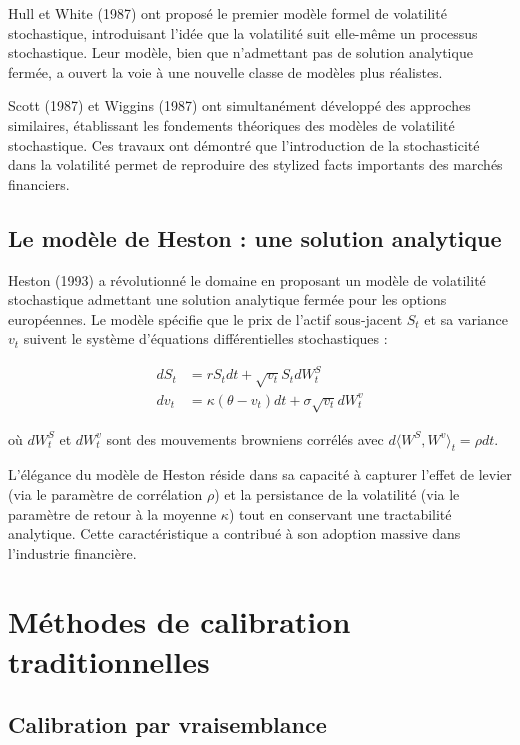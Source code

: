 Hull et White (1987) ont proposé le premier modèle formel de volatilité stochastique, introduisant l'idée que la volatilité suit elle-même un processus stochastique. Leur modèle, bien que n'admettant pas de solution analytique fermée, a ouvert la voie à une nouvelle classe de modèles plus réalistes.

Scott (1987) et Wiggins (1987) ont simultanément développé des approches similaires, établissant les fondements théoriques des modèles de volatilité stochastique. Ces travaux ont démontré que l'introduction de la stochasticité dans la volatilité permet de reproduire des stylized facts importants des marchés financiers.

\subsection{Le modèle de Heston : une solution analytique}

Heston (1993) a révolutionné le domaine en proposant un modèle de volatilité stochastique admettant une solution analytique fermée pour les options européennes. Le modèle spécifie que le prix de l'actif sous-jacent $S_t$ et sa variance $v_t$ suivent le système d'équations différentielles stochastiques :

\begin{align}
dS_t &= rS_t dt + \sqrt{v_t}S_t dW_t^S \\
dv_t &= \kappa(\theta - v_t)dt + \sigma\sqrt{v_t}dW_t^v
\end{align}

où $dW_t^S$ et $dW_t^v$ sont des mouvements browniens corrélés avec $d\langle W^S, W^v \rangle_t = \rho dt$.

L'élégance du modèle de Heston réside dans sa capacité à capturer l'effet de levier (via le paramètre de corrélation $\rho$) et la persistance de la volatilité (via le paramètre de retour à la moyenne $\kappa$) tout en conservant une tractabilité analytique. Cette caractéristique a contribué à son adoption massive dans l'industrie financière.

\section{Méthodes de calibration traditionnelles}

\subsection{Calibration par vraisemblance}

